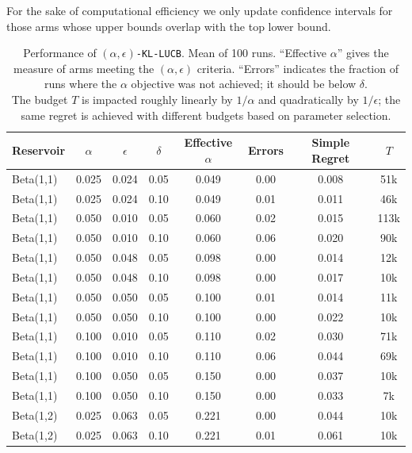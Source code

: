 For the sake of computational efficiency we only update confidence intervals for those arms whose upper bounds overlap 
with the top lower bound. 

\begin{table}
\caption{Performance of \texttt{$(\alpha,\epsilon)$-KL-LUCB}.
Mean of 100 runs.
``Effective $\alpha$'' gives the measure of arms meeting the $(\alpha,\epsilon)$
criteria.
``Errors'' indicates the fraction of runs where the $\alpha$
objective was not achieved; it should be below $\delta$.
\\
The budget $T$ is impacted roughly linearly by $1/\alpha$ and quadratically 
by $1/\epsilon$; the same regret is achieved with different budgets based
on parameter selection.
}
\label{tbl-results}
\vskip 0.15in
\begin{center}
\begin{small}
\begin{sc}
\begin{tabular}{lccc|cccc}
\hline
Reservoir & $\alpha$ & $\epsilon$ & $\delta$ & Effective $\alpha$ & Errors & Simple Regret & $T$ \\
\hline
Beta(1,1) & 0.025 & 0.024 & 0.05 & 0.049 & 0.00 & 0.008 & 51k \\
Beta(1,1) & 0.025 & 0.024 & 0.10 & 0.049 & 0.01 & 0.011 & 46k \\
Beta(1,1) & 0.050 & 0.010 & 0.05 & 0.060 & 0.02 & 0.015 & 113k \\
Beta(1,1) & 0.050 & 0.010 & 0.10 & 0.060 & 0.06 & 0.020 & 90k \\
Beta(1,1) & 0.050 & 0.048 & 0.05 & 0.098 & 0.00 & 0.014 & 12k \\
Beta(1,1) & 0.050 & 0.048 & 0.10 & 0.098 & 0.00 & 0.017 & 10k \\
Beta(1,1) & 0.050 & 0.050 & 0.05 & 0.100 & 0.01 & 0.014 & 11k \\
Beta(1,1) & 0.050 & 0.050 & 0.10 & 0.100 & 0.00 & 0.022 & 10k \\
Beta(1,1) & 0.100 & 0.010 & 0.05 & 0.110 & 0.02 & 0.030 & 71k \\
Beta(1,1) & 0.100 & 0.010 & 0.10 & 0.110 & 0.06 & 0.044 & 69k \\
Beta(1,1) & 0.100 & 0.050 & 0.05 & 0.150 & 0.00 & 0.037 & 10k \\
Beta(1,1) & 0.100 & 0.050 & 0.10 & 0.150 & 0.00 & 0.033 & 7k \\
Beta(1,2) & 0.025 & 0.063 & 0.05 & 0.221 & 0.00 & 0.044 & 10k \\
Beta(1,2) & 0.025 & 0.063 & 0.10 & 0.221 & 0.01 & 0.061 & 10k \\

\end{tabular}
\end{sc}
\end{small}
\end{center}
\end{table}
